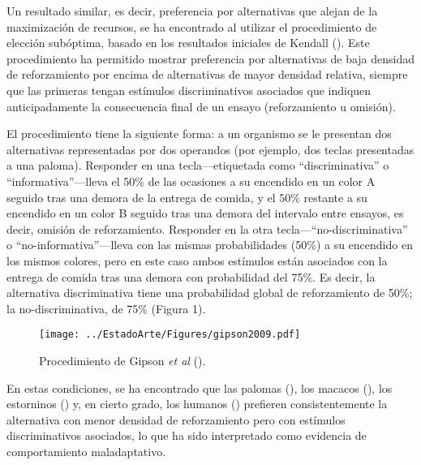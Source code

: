 \documentclass[a4paper,12pt]{article}
\begin{document}
Un resultado similar, es decir, preferencia por alternativas que alejan de la maximización de recursos, se ha encontrado al utilizar el procedimiento de elección subóptima, basado en los resultados iniciales de Kendall (\citeyear{Kendall1974,Kendall1985}). Este procedimiento ha permitido mostrar preferencia por alternativas de baja densidad de reforzamiento por encima de alternativas de mayor densidad relativa, siempre que las primeras tengan estímulos discriminativos asociados que indiquen anticipadamente la consecuencia final de un ensayo (reforzamiento u omisión).

El procedimiento tiene la siguiente forma: a un organismo se le presentan dos alternativas representadas por dos operandos (por ejemplo, dos teclas presentadas a una paloma).
Responder en una tecla---etiquetada como ``discriminativa'' o ``informativa''---lleva el 50\% de las ocasiones a su encendido en un color A seguido tras una demora de la entrega de comida, y el 50\% restante a su encendido en un color B seguido tras una demora del intervalo entre ensayos, es decir, omisión de reforzamiento.
Responder en la otra tecla---``no-discriminativa'' o ``no-informativa''---lleva con las mismas probabilidades (50\%) a su encendido en los mismos colores, pero en este caso ambos estímulos están asociados con la entrega de comida tras una demora con probabilidad del 75\%.
Es decir, la alternativa discriminativa tiene una probabilidad global de reforzamiento de 50\%; la no-discriminativa, de 75\% (Figura 1).

\begin{figure}[!ht]
        \begin{center}
                \texttt{[image: ../EstadoArte/Figures/gipson2009.pdf]}
                \caption{Procedimiento de Gipson {\itshape et al} (\cite{Gipson2009}).}
        \end{center}
\end{figure}

En estas condiciones, se ha encontrado que las palomas (\cite{Zentall2011a}), los macacos (\cite{Smith2017}), los estorninos (\cite{Vasconcelos2015}) y, en cierto grado, los humanos (\cite{Molet2012}) prefieren consistentemente la alternativa con menor densidad de reforzamiento pero con estímulos discriminativos asociados, lo que ha sido interpretado como evidencia de comportamiento maladaptativo.
\end{document}
